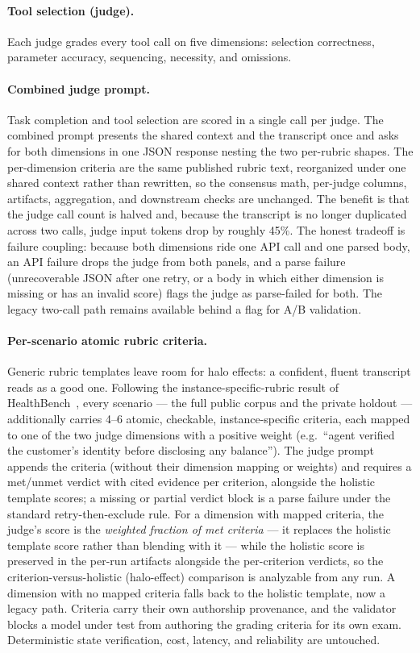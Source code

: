 \paragraph{Tool selection (judge).} Each judge grades every tool call on five
dimensions: selection correctness, parameter accuracy, sequencing, necessity, and
omissions.

\paragraph{Combined judge prompt.} Task completion and tool selection are scored
in a single call per judge. The combined prompt presents the shared context and the
transcript once and asks for both dimensions in one JSON response nesting the two
per-rubric shapes. The per-dimension criteria are the same published rubric text,
reorganized under one shared context rather than rewritten, so the consensus math,
per-judge columns, artifacts, aggregation, and downstream checks are unchanged. The
benefit is that the judge call count is halved and, because the transcript is no
longer duplicated across two calls, judge input tokens drop by roughly 45\%. The
honest tradeoff is failure coupling: because both dimensions ride one API call and
one parsed body, an API failure drops the judge from both panels, and a parse
failure (unrecoverable JSON after one retry, or a body in which either dimension is
missing or has an invalid score) flags the judge as parse-failed for both. The
legacy two-call path remains available behind a flag for A/B validation.

\paragraph{Per-scenario atomic rubric criteria.} Generic rubric templates leave
room for halo effects: a confident, fluent transcript reads as a good one.
Following the instance-specific-rubric result of
HealthBench~\cite{healthbench2025}, every scenario --- the full public corpus and
the private holdout --- additionally carries 4--6 atomic, checkable,
instance-specific criteria, each mapped to one of the two judge dimensions with
a positive weight (e.g.\ ``agent verified the customer's identity before
disclosing any balance''). The judge prompt appends the criteria (without their
dimension mapping or weights) and requires a met/unmet verdict with cited
evidence per criterion, alongside the holistic template scores; a missing or
partial verdict block is a parse failure under the standard
retry-then-exclude rule. For a dimension with mapped criteria, the judge's score
is the \emph{weighted fraction of met criteria} --- it replaces the holistic
template score rather than blending with it --- while the holistic score is
preserved in the per-run artifacts alongside the per-criterion verdicts, so the
criterion-versus-holistic (halo-effect) comparison is analyzable from any run.
A dimension with no mapped criteria falls back to the holistic template, now a
legacy path. Criteria carry their own authorship provenance, and the validator
blocks a model under test from authoring the grading criteria for its own exam.
Deterministic state verification, cost, latency, and reliability are untouched.

